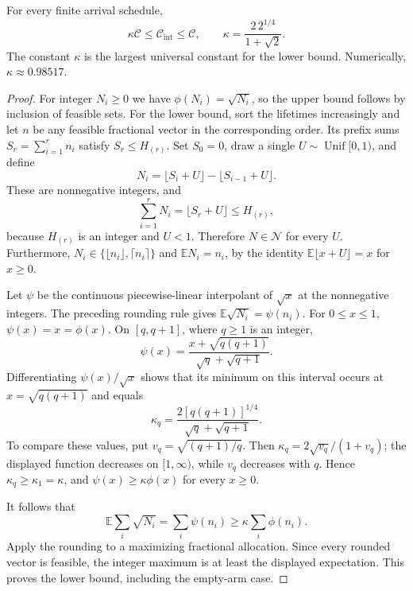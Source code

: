 \begin{theorem}
\label{thm:integer-capacity}
For every finite arrival schedule,
\begin{equation}
 \kappa\mathscr C\le\mathscr C_{\mathrm{int}}\le\mathscr C,
 \qquad
 \kappa=\frac{2\,2^{1/4}}{1+\sqrt2}.
 \label{eq:integer-capacity}
\end{equation}
The constant $\kappa$ is the largest universal constant for the lower
bound. Numerically, $\kappa\approx0.98517$.
\end{theorem}

\begin{proof}
For integer $N_i\ge0$ we have $\phi(N_i)=\sqrt{N_i}$, so the upper bound
follows by inclusion of feasible sets. For the lower bound, sort the
lifetimes increasingly and let $n$ be any feasible fractional vector
in the corresponding order. Its prefix sums $S_r=\sum_{i=1}^r n_i$
satisfy $S_r\le H_{(r)}$. Set $S_0=0$, draw a single
$U\sim\operatorname{Unif}[0,1)$, and define
\[
 N_i=\lfloor S_i+U\rfloor-\lfloor S_{i-1}+U\rfloor.
\]
These are nonnegative integers, and
\[
 \sum_{i=1}^rN_i=\lfloor S_r+U\rfloor\le H_{(r)},
\]
because $H_{(r)}$ is an integer and $U<1$. Therefore $N\in\mathcal N$
for every $U$. Furthermore,
$N_i\in\{\lfloor n_i\rfloor,\lceil n_i\rceil\}$ and
$\mathbb E N_i=n_i$, by the identity
$\mathbb E\lfloor x+U\rfloor=x$ for $x\ge0$.

Let $\psi$ be the continuous piecewise-linear interpolant of
$\sqrt{x}$ at the nonnegative integers. The preceding rounding rule
gives $\mathbb E\sqrt{N_i}=\psi(n_i)$. For $0\le x\le1$,
$\psi(x)=x=\phi(x)$. On $[q,q+1]$, where $q\ge1$ is an integer,
\[
 \psi(x)=\frac{x+\sqrt{q(q+1)}}{\sqrt q+\sqrt{q+1}}.
\]
Differentiating $\psi(x)/\sqrt{x}$ shows that its minimum on this
interval occurs at $x=\sqrt{q(q+1)}$ and equals
\[
 \kappa_q=
 \frac{2[q(q+1)]^{1/4}}{\sqrt q+\sqrt{q+1}}.
\]
To compare these values, put $v_q=\sqrt{(q+1)/q}$. Then
$\kappa_q=2\sqrt{v_q}/(1+v_q)$; the displayed function decreases on
$[1,\infty)$, while $v_q$ decreases with $q$. Hence
$\kappa_q\ge\kappa_1=\kappa$, and
$\psi(x)\ge\kappa\phi(x)$ for every $x\ge0$.

It follows that
\[
 \mathbb E\sum_i\sqrt{N_i}
 =\sum_i\psi(n_i)\ge\kappa\sum_i\phi(n_i).
\]
Apply the rounding to a maximizing fractional allocation. Since every
rounded vector is feasible, the integer maximum is at least the
displayed expectation. This proves the lower bound, including the
empty-arm case.


\end{proof}
